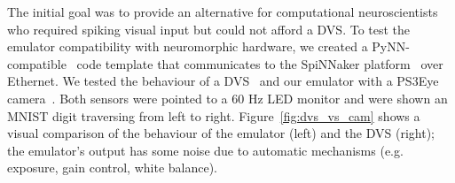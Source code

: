 \documentclass[conference]{IEEEtran}
\begin{document}
The initial goal was to provide an alternative for computational neuroscientists who required spiking visual input but could not afford a DVS. To test the emulator compatibility with neuromorphic hardware, we created a PyNN-compatible~\cite{pynn} code template that communicates to the SpiNNaker platform~\cite{spinnakerOverview} over Ethernet. We tested the behaviour of a DVS~\cite{bernabeDVS} and our emulator with a PS3Eye camera~\cite{wikipedia:ps3eye}. Both sensors were pointed to a 60 Hz LED monitor and were shown an MNIST digit traversing from left to right. Figure~\ref{fig:dvs_vs_cam} shows a visual comparison of the behaviour of the emulator (left) and the DVS (right); the emulator's output has some noise due to automatic mechanisms (e.g. exposure, gain control, white balance). 
\end{document}
